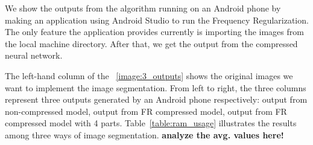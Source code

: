 \documentclass[conference]{IEEEtran}
\begin{document}
We show the outputs from the algorithm running on an Android phone by making an application using Android Studio to run the Frequency Regularization. The only feature the application provides currently is importing the images from the local machine directory. After that, we get the output from the compressed neural network. 

The left-hand column of the ~\ref{image:3_outputs} shows the original images we want to implement the image segmentation. From left to right, the three columns represent three outputs generated by an Android phone respectively: output from non-compressed model, output from FR compressed model, output from FR compressed model with 4 parts. Table~\ref{table:ram_usage} illustrates the results among three ways of image segmentation. \textbf{{analyze the avg. values here!}}

\end{document}
